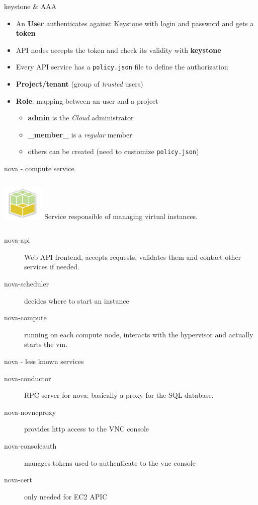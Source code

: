 \documentclass[english,serif,mathserif,usenames,dvipsnames]{beamer}
\begin{document}
\begin{frame}
  {keystone \& AAA}

  \begin{itemize}
  \item An \textbf{User} authenticates against Keystone with login and
    password and gets a \textbf{token}
  \item API nodes accepts the token and check its validity with
    \textbf{keystone}
  \item Every API service has a \texttt{policy.json} file to define
    the authorization
  \item \textbf{Project/tenant} (group of \textit{trusted} users)
  \item \textbf{Role}: mapping between an user and a project
    \begin{itemize}
    \item \textbf{admin} is the \textit{Cloud} administrator
    \item \textbf{\_member\_} is a \textit{regular} member
    \item others can be created (need to customize \texttt{policy.json})
    \end{itemize}
  \end{itemize}
\end{frame}

\begin{frame}
  {nova - compute service}
  \begin{columns}
    \column{2cm}
    \includegraphics[width=2cm]{openstack-compute-icon.png}
    \column{8cm}
    Service responsible of managing virtual instances.
  \end{columns}
  \begin{description}
  \item[nova-api] Web API frontend, accepts requests, validates them
    and contact other services if needed.
  \item[nova-scheduler] decides where to start an instance
  \item[nova-compute] running on each compute node, interacts with the
    hypervisor and actually starts the vm.
  \end{description}
\end{frame}

\begin{frame}
  {nova - less known services}
  \begin{description}
  \item[nova-conductor] RPC server for nova: basically a proxy for the
    SQL database.
  \item[nova-novncproxy] provides http access to the VNC console
  \item[nova-consoleauth] manages tokens used to authenticate to the
    vnc console
  \item[nova-cert] only needed for EC2 APIC
  \end{description}
\end{frame}
\end{document}
